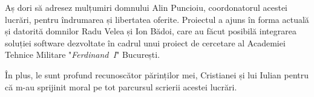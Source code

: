 \pagestyle{empty}
\vspace*{7cm}
\small

Aș dori să adresez mulțumiri domnului Alin Puncioiu, coordonatorul acestei lucrări, pentru îndrumarea și libertatea oferite. Proiectul a ajuns în forma actuală și datorită domnilor Radu Velea și Ion Bădoi, care au făcut posibilă integrarea soluției software dezvoltate în cadrul unui proiect de cercetare al Academiei Tehnice Militare "\mbox{\textit{Ferdinand I}}" București.

În plus, le sunt profund recunoscător părinților mei, Cristianei și lui Iulian pentru că m-au sprijinit moral pe tot parcursul scrierii acestei lucrări.

\normalsize
\newpage